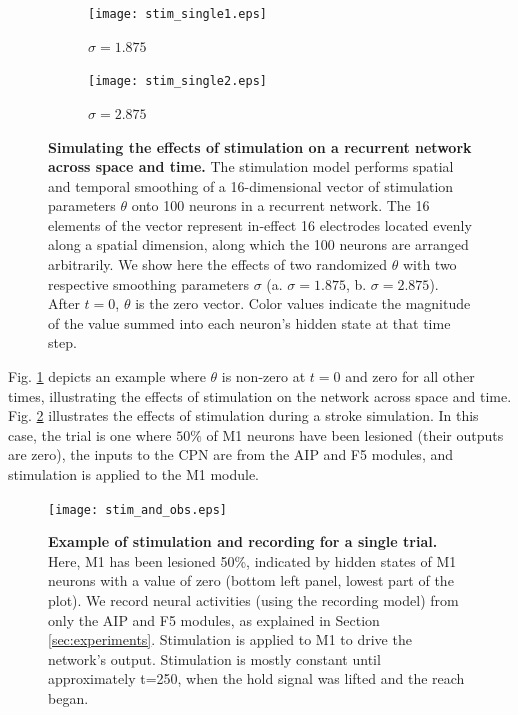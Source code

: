 \documentclass[12pt]{iopart}
\begin{document}
\begin{figure}[h]
	\begin{subfigure}[c]{0.45\textwidth}
		\centering
		\texttt{[image: stim\_single1.eps]}
		\caption{$\sigma=1.875$}
	\end{subfigure}
	\hfill
	\begin{subfigure}[c]{0.45\textwidth}
		\centering
		\texttt{[image: stim\_single2.eps]}
		\caption{$\sigma=2.875$}
	\end{subfigure}

	\caption{\textbf{Simulating the effects of stimulation on a recurrent network across space and time.}
          The stimulation model performs spatial and temporal smoothing of a 16-dimensional
	         vector of stimulation parameters $\theta$ onto 100 neurons in a recurrent network.
	         The 16 elements of the vector represent in-effect 16 electrodes located
	         evenly along a spatial dimension, along which the 100 neurons are arranged
	         arbitrarily. We show here the effects of two randomized $\theta$ with two respective smoothing
	         parameters $\sigma$ (a. $\sigma=1.875$, b. $\sigma=2.875$). After $t=0$, $\theta$ is the zero
		   vector. Color values indicate the magnitude of the value summed into each neuron's hidden
		   state at that time step.}
	\label{fig:stim_single}
\end{figure}

\noindent Fig. \ref{fig:stim_single} depicts an example where
$\theta$ is non-zero at $t=0$ and zero for all other times, illustrating the effects of 
stimulation on the network across space and time.  Fig. \ref{fig:stim_and_obs} illustrates the
effects of stimulation during a stroke simulation. In this case, the trial is one where $50\%$
of M1 neurons have been  lesioned (their outputs are zero), the inputs to the CPN are from the
AIP and F5 modules, and stimulation is applied to the M1 module.

\begin{figure}[h]
	\centering
	\texttt{[image: stim\_and\_obs.eps]}
	\caption{\textbf{Example of stimulation and recording for a single trial.} Here, M1
	has been lesioned 50\%, indicated by hidden states of M1 neurons with a value of zero (bottom
	left panel, lowest part of the plot). We record neural activities (using the recording model) from only
	 the AIP and F5 modules, as explained in Section \ref{sec:experiments}. Stimulation is applied
	to M1 to drive the network's output. Stimulation is mostly constant until approximately t=250,
	when the hold signal was lifted and the reach began.}
	\label{fig:stim_and_obs}
\end{figure}
\end{document}
